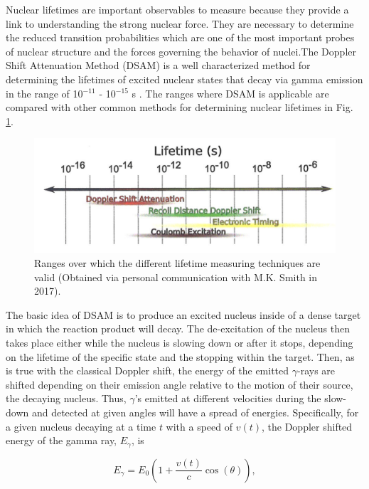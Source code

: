 Nuclear lifetimes are important observables to measure because they provide a link to understanding the strong nuclear force. They are necessary to determine the reduced transition probabilities which are one of the most important probes of nuclear structure and the forces governing the behavior of nuclei.The Doppler Shift Attenuation Method (DSAM) is a well characterized method for determining the lifetimes of excited nuclear states that decay via gamma emission in the range of 10$^{-11}$ - 10$^{-15}$ s \cite{Blaugrund1966}. The ranges where DSAM is applicable are compared with other common methods for determining nuclear lifetimes in Fig. \ref{fig: lifetimeRanges}. 


\begin{figure}
\includegraphics[width=\linewidth]{figures/lifetimeTechniques.png}
\caption{Ranges over which the different lifetime measuring techniques are valid (Obtained via personal communication with M.K. Smith in 2017).}
\label{fig: lifetimeRanges}
\end{figure}


The basic idea of DSAM is to produce an excited nucleus inside of a dense target in which the reaction product will decay. The de-excitation of the nucleus then takes place either while the nucleus is slowing down or after it stops, depending on the lifetime of the specific state and the stopping within the target. Then, as is true with the classical Doppler shift, the energy of the emitted $\gamma$-rays are shifted depending on their emission angle relative to the motion of their source, the decaying nucleus. Thus, $\gamma$'s emitted at different velocities during the slow-down and detected at given angles will have a spread of energies. Specifically, for a given nucleus decaying at a time $t$ with a speed of $v(t)$, the Doppler shifted energy of the gamma ray, $E_{\gamma}$, is 

\begin{equation}
E_{\gamma} = E_{0} \left(1 + \dfrac{v(t)}{c} \cos (\theta)   \right),
\label{eqn: doppler1}
\end{equation}

